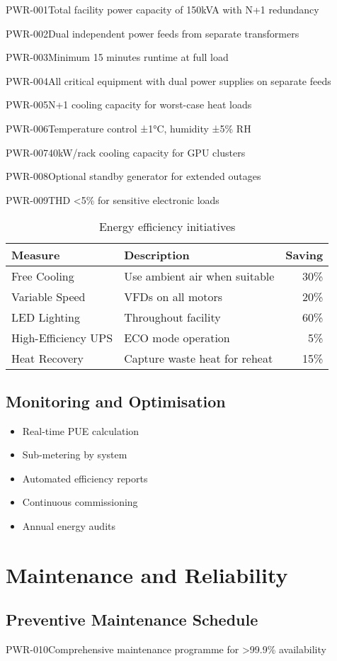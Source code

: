 \begin{requirement}{PWR-001}{Total facility power capacity of 150kVA with N+1 redundancy}
\begin{requirement}{PWR-002}{Dual independent power feeds from separate transformers}
\begin{requirement}{PWR-003}{Minimum 15 minutes runtime at full load}
\begin{requirement}{PWR-004}{All critical equipment with dual power supplies on separate feeds}
\begin{requirement}{PWR-005}{N+1 cooling capacity for worst-case heat loads}
\begin{requirement}{PWR-006}{Temperature control ±1°C, humidity ±5\% RH}
\begin{requirement}{PWR-007}{40kW/rack cooling capacity for GPU clusters}
\begin{requirement}{PWR-008}{Optional standby generator for extended outages}
\begin{requirement}{PWR-009}{THD <5\% for sensitive electronic loads}
\begin{table}[H]
\centering
\begin{tabularx}{\textwidth}{@{}lXr@{}}
\toprule
\textbf{Measure} & \textbf{Description} & \textbf{Saving} \\
\midrule
Free Cooling & Use ambient air when suitable & 30\% \\
Variable Speed & VFDs on all motors & 20\% \\
LED Lighting & Throughout facility & 60\% \\
High-Efficiency UPS & ECO mode operation & 5\% \\
Heat Recovery & Capture waste heat for reheat & 15\% \\
\bottomrule
\end{tabularx}
\caption{Energy efficiency initiatives}
\end{table}

\subsection{Monitoring and Optimisation}

\begin{itemize}
    \item Real-time PUE calculation
    \item Sub-metering by system
    \item Automated efficiency reports
    \item Continuous commissioning
    \item Annual energy audits
\end{itemize}

\section{Maintenance and Reliability}

\subsection{Preventive Maintenance Schedule}

\begin{requirement}{PWR-010}{Comprehensive maintenance programme for >99.9\% availability}


\end{requirement}
\end{requirement}
\end{requirement}
\end{requirement}
\end{requirement}
\end{requirement}
\end{requirement}
\end{requirement}
\end{requirement}
\end{requirement}
